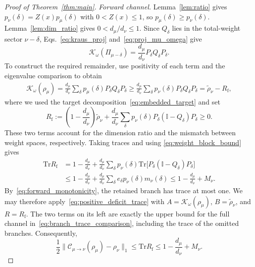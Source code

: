 \documentclass[a4paper,onecolumn,11pt]{quantumarticle}
\def\id{\mathbb{I}}
\newcommand*{\Tr}{\mathrm{Tr}}
\def\C{\mathcal{C}}
\begin{document}
\begin{proof}[Proof of Theorem~\ref{thm:main}]
\emph{Forward channel.}
Lemma~\ref{lem:ratio} gives $p_\nu(\delta)=Z(x)p_\mu(\delta)$
with $0<Z(x)\le1$, so $p_\mu(\delta)\ge p_\nu(\delta)$.
Lemma~\ref{lem:dim_ratio} gives $0<d_\mu/d_\nu\le1$.
Since $Q_\delta$ lies in the total-weight sector $\nu-\delta$,
Eqs.~\eqref{eq:kraus_proj} and~\eqref{eq:proj_mu_omega} give
\[
\mathcal K_\omega(\Pi_{\mu-\delta})
=\frac{d_\mu}{d_\nu}P_\delta Q_\delta P_\delta.
\]
To construct the required remainder, use positivity of each term
and the eigenvalue comparison to obtain
\begin{align*}
\mathcal K_\omega(\rho_\mu)
=\frac{d_\mu}{d_\nu}\sum_\delta p_\mu(\delta)P_\delta Q_\delta P_\delta
\ge\frac{d_\mu}{d_\nu}\sum_\delta p_\nu(\delta)P_\delta Q_\delta P_\delta
=\widetilde\rho_\nu-R_{\mathrm f},
\end{align*}
where we used the target decomposition~\eqref{eq:embedded_target} and set
\[
R_{\mathrm f}:=\left(1-\frac{d_\mu}{d_\nu}\right)\widetilde\rho_\nu
+\frac{d_\mu}{d_\nu}\sum_\delta p_\nu(\delta)
P_\delta(\id-Q_\delta)P_\delta\ge0.
\]
These two terms account for the dimension ratio and the mismatch
between weight spaces, respectively. Taking traces and using
\eqref{eq:weight_block_bound} gives
\begin{align*}
\Tr R_{\mathrm f}
&=1-\frac{d_\mu}{d_\nu}
+\frac{d_\mu}{d_\nu}\sum_\delta p_\nu(\delta)
\Tr\bigl[P_\delta(\id-Q_\delta)P_\delta\bigr]\\
&\le1-\frac{d_\mu}{d_\nu}
+\frac{d_\mu}{d_\nu}\sum_\delta
 e_\delta p_\nu(\delta)m_\nu(\delta)
\le1-\frac{d_\mu}{d_\nu}+M_\nu.
\end{align*}
By~\eqref{eq:forward_monotonicity}, the retained branch has trace at
most one. We may therefore apply~\eqref{eq:positive_deficit_trace}
with $A=\mathcal K_\omega(\rho_\mu)$, $B=\widetilde\rho_\nu$,
and $R=R_{\mathrm f}$. The two terms on its left are exactly the
upper bound for the full channel in~\eqref{eq:branch_trace_comparison},
including the trace of the omitted branches. Consequently,
\begin{equation}\label{eq:forward_finite_deficit}
\frac12\|\C_{\mu\to\nu}(\rho_\mu)-\rho_\nu\|_1
\le\Tr R_{\mathrm f}
\le1-\frac{d_\mu}{d_\nu}+M_\nu.
\end{equation}


\end{proof}
\end{document}
